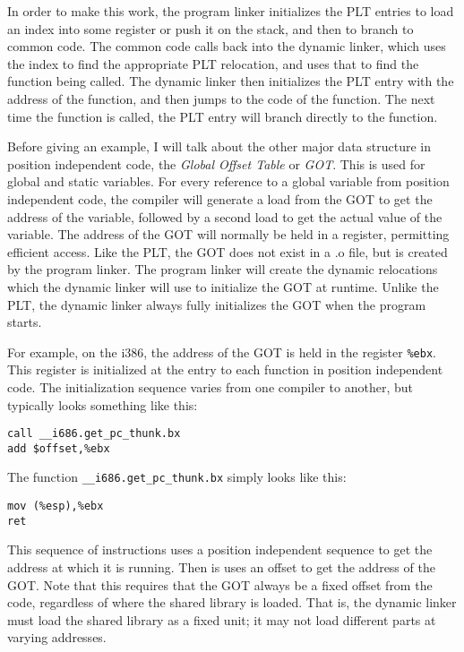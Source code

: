 In order to make this work, the program linker initializes the PLT
entries to load an index into some register or push it on the stack,
and then to branch to common code. The common code calls back into
the dynamic linker, which uses the index to find the appropriate PLT
relocation, and uses that to find the function being called. The dynamic
linker then initializes the PLT entry with the address of the function,
and then jumps to the code of the function. The next time the function
is called, the PLT entry will branch directly to the function.

Before giving an example, I will talk about the other major data
structure in position independent code, the \emph{Global Offset Table}
or \emph{GOT}\@. This is used for global and static variables. For
every reference to a global variable from position independent code,
the compiler will generate a load from the GOT to get the address of
the variable, followed by a second load to get the actual value of the
variable. The address of the GOT will normally be held in a register,
permitting efficient access. Like the PLT, the GOT does not exist in a
.o file, but is created by the program linker. The program linker will
create the dynamic relocations which the dynamic linker will use to
initialize the GOT at runtime. Unlike the PLT, the dynamic linker always
fully initializes the GOT when the program starts.

For example, on the i386, the address of the GOT is held in the register
\texttt{\%ebx}. This register is initialized at the entry to each
function in position independent code. The initialization sequence
varies from one compiler to another, but typically looks something like
this:

\begin{lstlisting}
call __i686.get_pc_thunk.bx
add $offset,%ebx
\end{lstlisting}

The function \texttt{\_\_i686.get\_pc\_thunk.bx} simply looks like this:

\begin{lstlisting}
mov (%esp),%ebx
ret
\end{lstlisting}

This sequence of instructions uses a position independent sequence to
get the address at which it is running. Then is uses an offset to get
the address of the GOT\@. Note that this requires that the GOT always be
a fixed offset from the code, regardless of where the shared library is
loaded. That is, the dynamic linker must load the shared library as a
fixed unit; it may not load different parts at varying addresses.

